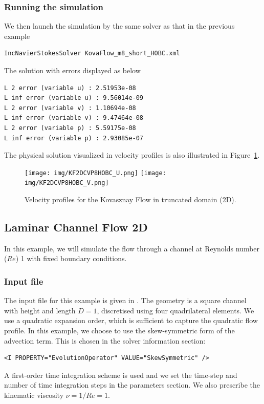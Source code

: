 \subsubsection{Running the simulation}
We then launch the simulation by the same solver as that in the previous example
\begin{lstlisting}[style=BashInputStyle]
IncNavierStokesSolver KovaFlow_m8_short_HOBC.xml
\end{lstlisting} 
 The solution with errors displayed as below
\begin{lstlisting}[style=BashInputStyle]
L 2 error (variable u) : 2.51953e-08
L inf error (variable u) : 9.56014e-09
L 2 error (variable v) : 1.10694e-08
L inf error (variable v) : 9.47464e-08
L 2 error (variable p) : 5.59175e-08
L inf error (variable p) : 2.93085e-07
\end{lstlisting}

The physical solution visualized in velocity profiles is also illustrated in 
Figure~\ref{f:incns:kovaflow2d_hobc}.

\begin{figure}
\begin{center}
\texttt{[image: img/KF2DCVP8HOBC\_U.png]}
\texttt{[image: img/KF2DCVP8HOBC\_V.png]}
\caption{Velocity profiles for the Kovasznay Flow in truncated domain (2D).}
\label{f:incns:kovaflow2d_hobc}
\end{center}
\end{figure}

\subsection{Laminar Channel Flow 2D}
\label{s:incns:LaminarChannelFlow2D}
In this example, we will simulate the flow through a channel at Reynolds number
($Re$) 1 with fixed boundary conditions.

\subsubsection{Input file}
The input file for this example is given in . The
geometry is a square channel with height and length $D=1$, discretised using
four quadrilateral elements. We use a quadratic expansion order, which is
sufficient to capture the quadratic flow profile. In this example, we choose to
use the skew-symmetric form of the advection term. This is chosen in the solver
information section:
\begin{lstlisting}[style=XMLStyle]
<I PROPERTY="EvolutionOperator" VALUE="SkewSymmetric" />
\end{lstlisting}
A first-order time integration scheme is used and we set the time-step and
number of time integration steps in the parameters section. We also prescribe
the kinematic viscosity $\nu = 1/Re = 1$.

